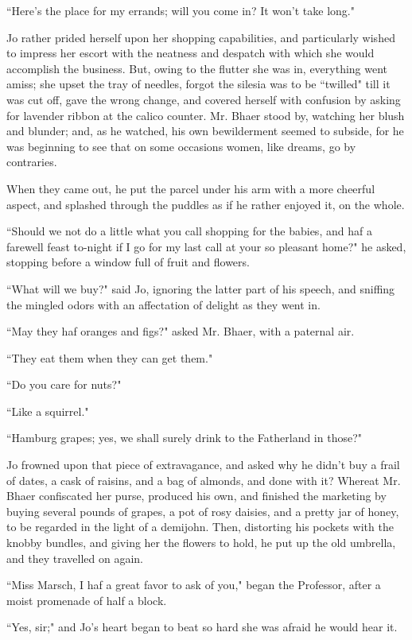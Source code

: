 ``Here's the place for my errands; will you come in? It
won't take long."

Jo rather prided herself upon her shopping capabilities, and
particularly wished to impress her escort with the neatness and despatch
with which she would accomplish the business. But, owing to the flutter
she was in, everything went amiss; she upset the tray of needles, forgot
the silesia was to be ``twilled" till it was cut off, gave the wrong
change, and covered herself with confusion by asking for lavender ribbon
at the calico counter. Mr. Bhaer stood by, watching her blush and
blunder; and, as he watched, his own bewilderment seemed to subside, for
he was beginning to see that on some occasions women, like dreams, go by
contraries.

When they came out, he put the parcel under his arm with a more cheerful
aspect, and splashed through the puddles as if he rather enjoyed it, on
the whole.

``Should we not do a little what you call shopping for the babies, and
haf a farewell feast to-night if I go for my last call at your so
pleasant home?" he asked, stopping before a window full of fruit and
flowers.

``What will we buy?" said Jo, ignoring the latter part of his speech, and
sniffing the mingled odors with an affectation of delight as they went
in.

``May they haf oranges and figs?" asked Mr. Bhaer, with a paternal air.

``They eat them when they can get them."

``Do you care for nuts?"

``Like a squirrel."

``Hamburg grapes; yes, we shall surely drink to the Fatherland in those?"

Jo frowned upon that piece of extravagance, and asked why he
didn't buy a frail of dates, a cask of raisins, and a
bag of almonds, and done with it? Whereat Mr. Bhaer confiscated her
purse, produced his own, and finished the marketing by buying several
pounds of grapes, a pot of rosy daisies, and a pretty jar of honey, to
be regarded in the light of a demijohn. Then, distorting his pockets
with the knobby bundles, and giving her the flowers to hold, he put up
the old umbrella, and they travelled on again.

``Miss Marsch, I haf a great favor to ask of you," began the Professor,
after a moist promenade of half a block.

``Yes, sir;" and Jo's heart began to beat so hard she was
afraid he would hear it.

